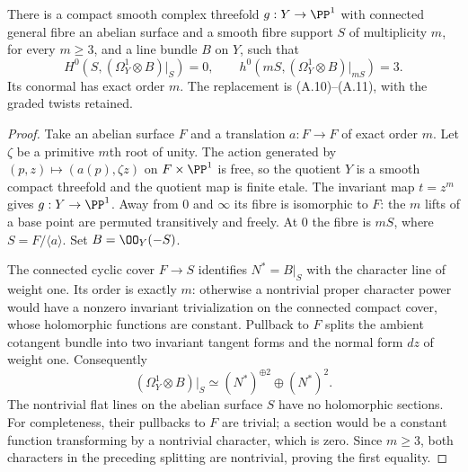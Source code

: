 
\begin{proposition}\label{cdp:st:A.3.2}
There is a compact smooth complex threefold $g:Y\to\PP^1$ with connected general fibre an abelian surface and a smooth fibre support $S$ of multiplicity $m$, for every $m\ge3$, and a line bundle $B$ on $Y$, such that
\[
H^0(S,(\Omega_Y^1\otimes B)|_S)=0,
\qquad h^0(mS,(\Omega_Y^1\otimes B)|_{mS})=3.
\tag{A.12}\label{cdp:eq:A.12}
\]
Its conormal has exact order $m$. The replacement is (A.10)--(A.11), with the graded twists retained.
\end{proposition}
\begin{proof}
Take an abelian surface $F$ and a translation $a:F\to F$ of exact order $m$. Let $\zeta$ be a primitive $m$th root of unity. The action generated by $(p,z)\mapsto(a(p),\zeta z)$ on $F\times\PP^1$ is free, so the quotient $Y$ is a smooth compact threefold and the quotient map is finite etale. The invariant map $t=z^m$ gives $g:Y\to\PP^1$. Away from $0$ and $\infty$ its fibre is isomorphic to $F$: the $m$ lifts of a base point are permuted transitively and freely. At $0$ the fibre is $mS$, where $S=F/\langle a\rangle$. Set $B=\OO_Y(-S)$.

The connected cyclic cover $F\to S$ identifies $N^*=B|_S$ with the character line of weight one. Its order is exactly $m$: otherwise a nontrivial proper character power would have a nonzero invariant trivialization on the connected compact cover, whose holomorphic functions are constant. Pullback to $F$ splits the ambient cotangent bundle into two invariant tangent forms and the normal form $dz$ of weight one. Consequently
\[
 (\Omega_Y^1\otimes B)|_S\simeq (N^*)^{\oplus2}\oplus(N^*)^2.
\]
The nontrivial flat lines on the abelian surface $S$ have no holomorphic sections. For completeness, their pullbacks to $F$ are trivial; a section would be a constant function transforming by a nontrivial character, which is zero. Since $m\ge3$, both characters in the preceding splitting are nontrivial, proving the first equality.


\end{proof}
